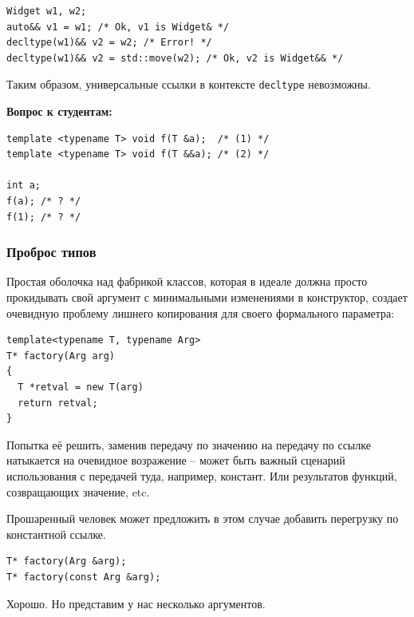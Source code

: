 \documentclass[a4paper,12pt,oneside]{article}
\newif\ifanswers
\begin{document}
\begin{lstlisting}
Widget w1, w2;
auto&& v1 = w1; /* Ok, v1 is Widget& */
decltype(w1)&& v2 = w2; /* Error! */
decltype(w1)&& v2 = std::move(w2); /* Ok, v2 is Widget&& */
\end{lstlisting}

Таким образом, универсальные ссылки в контексте \lstinline!decltype! невозможны.

\textbf{Вопрос к студентам:}

\begin{lstlisting}
template <typename T> void f(T &a);  /* (1) */
template <typename T> void f(T &&a); /* (2) */

int a;
f(a); /* ? */
f(1); /* ? */
\end{lstlisting}

\ifanswers
Знание об универсальных ссылках теперь должно подсказать правильный ответ: оба раза будет вызвана вторая функция. Это надо запомнить как правило (прописано в новой книжке Майерса \cite{effmoderncpp}): никогда не перегружайте функции по универсальной ссылке.
\fi

\subsubsection{Проброс типов}\label{PerfectForw}

Простая оболочка над фабрикой классов, которая в идеале должна просто прокидывать свой аргумент с минимальными изменениями в конструктор, создает очевидную проблему лишнего копирования для своего формального параметра:

\begin{lstlisting}
template<typename T, typename Arg> 
T* factory(Arg arg)
{ 
  T *retval = new T(arg)
  return retval;
} 
\end{lstlisting}

Попытка её решить, заменив передачу по значению на передачу по ссылке натыкается на очевидное возражение -- может быть важный сценарий использования с передачей туда, например, констант. Или результатов функций, созвращающих значение, etc.

Прошаренный человек может предложить в этом случае добавить перегрузку по константной ссылке. 

\begin{lstlisting}
T* factory(Arg &arg);
T* factory(const Arg &arg);
\end{lstlisting}

Хорошо. Но представим у нас несколько аргументов. 
\end{document}
